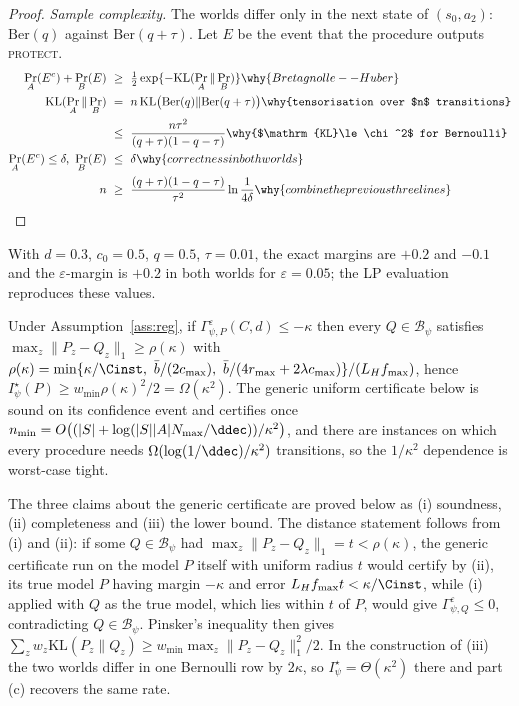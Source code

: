 \begin{proof}
\emph{Sample complexity.} The worlds differ only in the next state of
$(s_0,a_2)$: $\mathrm{Ber}(q)$ against $\mathrm{Ber}(q+\tau)$. Let $E$ be the
event that the procedure outputs \textsc{protect}.
\begin{align*}
\Pr_A(E^c)+\Pr_B(E)\ &\ge\ \tfrac12\exp\{-\mathrm{KL}(\Pr_A\Vert\Pr_B)\}
   \why{Bretagnolle--Huber}\\
\mathrm{KL}(\Pr_A\Vert\Pr_B)\ &=\ n\,\mathrm{KL}\big(\mathrm{Ber}(q)\Vert\mathrm{Ber}(q+\tau)\big)
   \why{tensorisation over $n$ transitions}\\
   &\le\ \frac{n\tau^2}{(q+\tau)(1-q-\tau)}
   \why{$\mathrm{KL}\le\chi^2$ for Bernoulli}\\
\Pr_A(E^c)\le\delta,\ \Pr_B(E)\ &\le\ \delta \why{correctness in both worlds}\\
n\ &\ge\ \frac{(q+\tau)(1-q-\tau)}{\tau^{2}}\ln\frac{1}{4\delta}
   \why{combine the previous three lines}
\end{align*}
\end{proof}

\noindent With $d=0.3$, $c_0=0.5$, $q=0.5$, $\tau=0.01$, the exact
margins are $+0.2$ and $-0.1$ and the $\varepsilon$-margin is $+0.2$ in both
worlds for $\varepsilon=0.05$; the LP evaluation reproduces these values.

\begin{corollary}
\label{cor:margin}
Under Assumption~\ref{ass:reg}, if $\Gamma^\varepsilon_{\psi,P}(C,d)\le-\kappa$ then every
$Q\in\mathcal B_\psi$ satisfies $\max_z\|P_z-Q_z\|_1\ge\rho(\kappa)$ with
$\rho(\kappa)=\min\{\kappa/\Cinst,\ \bar b/(2c_{\max}),\ \bar b/(4r_{\max}+2\lambda c_{\max})\}/(L_Hf_{\max})$,
hence $I^\star_\psi(P)\ge w_{\min}\rho(\kappa)^2/2=\Omega(\kappa^2)$. The generic uniform
certificate below is sound on its confidence event and certifies once
$n_{\min}=O\big((|S|+\log(|S||A|N_{\max}/\ddec))/\kappa^2\big)$, and there are instances on
which every procedure needs $\Omega(\log(1/\ddec)/\kappa^2)$ transitions, so the
$1/\kappa^2$ dependence is worst-case tight.
\end{corollary}

\noindent The three claims about the generic certificate are proved below as (i) soundness,
(ii) completeness and (iii) the lower bound. The distance statement follows from (i) and (ii):
if some $Q\in\mathcal B_\psi$ had $\max_z\|P_z-Q_z\|_1=t<\rho(\kappa)$, the generic certificate
run on the model $P$ itself with uniform radius $t$ would certify by (ii), its true model $P$
having margin $-\kappa$ and error $L_Hf_{\max}t<\kappa/\Cinst$, while (i) applied with $Q$ as
the true model, which lies within $t$ of $P$, would give $\Gamma^\varepsilon_{\psi,Q}\le0$,
contradicting $Q\in\mathcal B_\psi$. Pinsker's inequality then gives
$\sum_zw_z\mathrm{KL}(P_z\|Q_z)\ge w_{\min}\max_z\|P_z-Q_z\|_1^2/2$. In the construction of
(iii) the two worlds differ in one Bernoulli row by $2\kappa$, so $I^\star_\psi=\Theta(\kappa^2)$
there and part (c) recovers the same rate.

